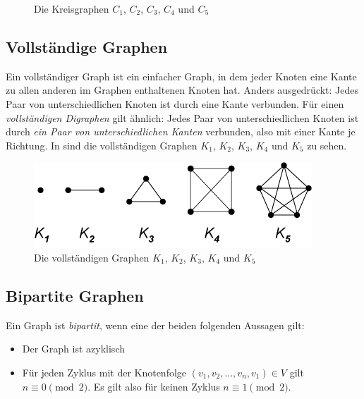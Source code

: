             \begin{figure}
                \centering
                
                \caption{Die Kreisgraphen $C_1$, $C_2$, $C_3$, $C_4$ und $C_5$\\\cite{EZ:Web14}}
                \label{fig:cycle-graphs}
            \end{figure}

        \subsection{Vollständige Graphen}
        
            Ein vollständiger Graph ist ein einfacher Graph, in dem jeder Knoten eine Kante zu allen anderen im Graphen enthaltenen Knoten hat. Anders ausgedrückt: Jedes Paar von unterschiedlichen Knoten ist durch eine Kante verbunden. Für einen \emph{vollständigen Digraphen} gilt ähnlich: Jedes Paar von unterschiedlichen Knoten ist durch \textit{ein Paar von unterschiedlichen Kanten} verbunden, also mit einer Kante je Richtung. In  sind die vollständigen Graphen $K_1$, $K_2$, $K_3$, $K_4$ und $K_5$ zu sehen. \cite{EZ:Web33, EZ:Web34}

            \begin{figure}
                \centering
                \includegraphics[width=0.5\linewidth]{images/complete-graphs.png}
                \caption{Die vollständigen Graphen $K_1$, $K_2$, $K_3$, $K_4$ und $K_5$\\\cite{EZ:Web33}}
                \label{fig:complete-graphs}
            \end{figure}

        \subsection{Bipartite Graphen}

            Ein Graph ist \emph{bipartit}, wenn eine der beiden folgenden Aussagen gilt:

            \begin{itemize}
                \item Der Graph ist azyklisch

                \item Für jeden Zyklus mit der Knotenfolge $(v_1, v_2, \ldots, v_n, v_1) \in V$ gilt $n \equiv 0 \pmod{2}$. Es gilt also für keinen Zyklus $n \equiv 1 \pmod{2}$.
            \end{itemize}
            
